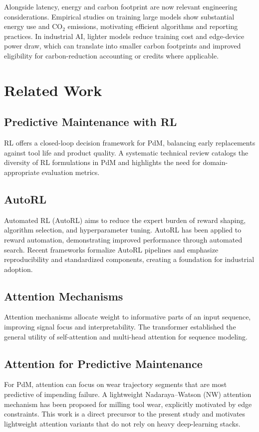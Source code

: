 \documentclass[11pt]{article}
\begin{document}
Alongside latency, energy and carbon footprint are now relevant engineering considerations. Empirical studies on training large models show substantial energy use and CO$_2$ emissions, motivating efficient algorithms and reporting practices. \cite{Strubell2019EnergyPolicy,Patterson2021Carbon} In industrial AI, lighter models reduce training cost and edge-device power draw, which can translate into smaller carbon footprints and improved eligibility for carbon-reduction accounting or credits where applicable.

\section{Related Work}
\subsection{Predictive Maintenance with RL}
RL offers a closed-loop decision framework for PdM, balancing early replacements against tool life and product quality. A systematic technical review catalogs the diversity of RL formulations in PdM and highlights the need for domain-appropriate evaluation metrics. \cite{Siraskar2023RLReview}

\subsection{AutoRL}
Automated RL (AutoRL) aims to reduce the expert burden of reward shaping, algorithm selection, and hyperparameter tuning. AutoRL has been applied to reward automation, demonstrating improved performance through automated search. \cite{Faust2019EvolvingRewards} Recent frameworks formalize AutoRL pipelines and emphasize reproducibility and standardized components, creating a foundation for industrial adoption. \cite{ARLO2023}

\subsection{Attention Mechanisms}
Attention mechanisms allocate weight to informative parts of an input sequence, improving signal focus and interpretability. The transformer established the general utility of self-attention and multi-head attention for sequence modeling. \cite{Vaswani2017Attention}

\subsection{Attention for Predictive Maintenance}
For PdM, attention can focus on wear trajectory segments that are most predictive of impending failure. A lightweight Nadaraya--Watson (NW) attention mechanism has been proposed for milling tool wear, explicitly motivated by edge constraints. \cite{Siraskar2024NW} This work is a direct precursor to the present study and motivates lightweight attention variants that do not rely on heavy deep-learning stacks.
\end{document}
